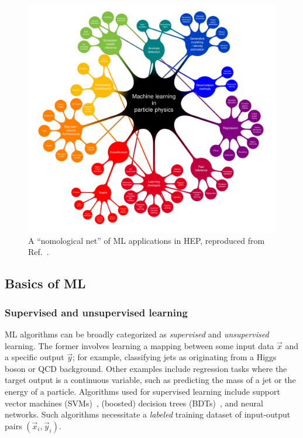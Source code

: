 \begin{figure}[ht!]
    \centering
    \includegraphics[width=\textwidth]{figures/03-ML/nomological_net}
    \caption{A ``nomological net'' of ML applications in HEP, reproduced from Ref.~\cite{lincoln2024instrumentation}.}
    \label{fig:03_ml_nomological_net}
\end{figure}

\subsection{Basics of ML}
\label{sec:03_ml_basics}

\subsubsection{Supervised and unsupervised learning}

ML algorithms can be broadly categorized as \textit{supervised} and \textit{unsupervised} learning.
The former involves learning a mapping between some input data ${\vec{x}}$ and a specific output $\vec{y}$; for example, classifying jets as originating from a Higgs boson or QCD background.
Other examples include regression tasks where the target output is a continuous variable, such as predicting the mass of a jet or the energy of a particle.
Algorithms used for supervised learning include support vector machines (SVMs)~\cite{cortes1995support}, (boosted) decision trees (BDTs)~\cite{breiman1984classification, hastie2009boosting}, and neural networks.
Such algorithms necessitate a \textit{labeled} training dataset of input-output pairs $(\vec{x}_i, \vec{y}_i)$.

